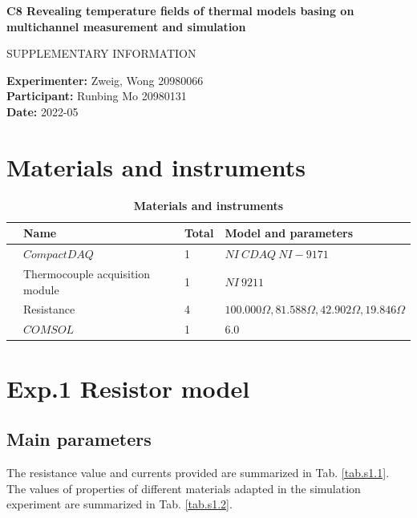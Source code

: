\documentclass[12pt,a4paper,UTF8]{article}
\begin{document}

\begin{center}
\LARGE\textbf{C8 Revealing temperature fields of thermal models basing on multichannel measurement and simulation}

\vspace{0.5em}
\large{SUPPLEMENTARY INFORMATION}
\end{center}

\noindent
\textbf{Experimenter:} Zweig, Wong 20980066 \\
\textbf{Participant:} Runbing Mo 20980131 \\
\textbf{Date:} 2022-05


\tableofcontents
\newpage

\section{Materials and instruments}
\begin{table}[htbp]
    \centering
    \caption{\textbf{Materials and instruments}}
        \begin{tabular}{llll}
            \toprule
            &Name &Total &Model and parameters \\
            \midrule
            &$CompactDAQ$	&1	&$NI\ CDAQ\ NI-9171$    \\    
            &Thermocouple acquisition module	&1	&$NI\ 9211$    \\    
            &Resistance	&4	&$100.000\Omega,81.588\Omega,42.902\Omega,19.846\Omega$    \\ 
            &$COMSOL$	&1	&$6.0$    \\ 
            \bottomrule
        \end{tabular}
\end{table}	


\section{Exp.1 Resistor model}
    \subsection{Main parameters}
    The resistance value and currents provided are summarized in Tab. \ref{tab.s1.1}. 
    The values of properties of different materials adapted in the simulation experiment are summarized in Tab. \ref{tab.s1.2}. 
    
\end{document}
